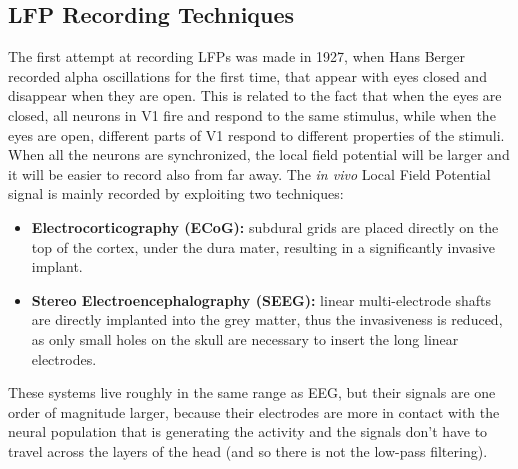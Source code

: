 \subsection{LFP Recording Techniques}
The first attempt at recording LFPs was made in 1927, when Hans Berger recorded alpha 
oscillations for the first time, that appear with eyes closed and disappear when 
they are open. This is related to the fact that when the eyes are closed, all neurons 
in V1 fire and respond to the same stimulus, while when the eyes are open, different parts 
of V1 respond to different properties of the stimuli. When all the neurons are synchronized, 
the local field potential will be larger and it will be easier to record also from far away.
The \textit{in vivo} Local Field Potential signal is mainly recorded by exploiting
two techniques:
\begin{itemize}
    \item \textbf{Electrocorticography (ECoG):} subdural grids are placed directly on
    the top of the cortex, under the dura mater, resulting in a significantly
    invasive implant.
    \item \textbf{Stereo Electroencephalography (SEEG):} linear multi-electrode shafts
    are directly implanted into the grey matter, thus the invasiveness is reduced,
    as only small holes on the skull are necessary to insert the long linear electrodes.
\end{itemize}
These systems live roughly in the same range as EEG, but their signals are one order of 
magnitude larger, because their electrodes are more in contact with the neural population 
that is generating the activity and the signals don't have to travel across the layers of 
the head (and so there is not the low-pass filtering).

